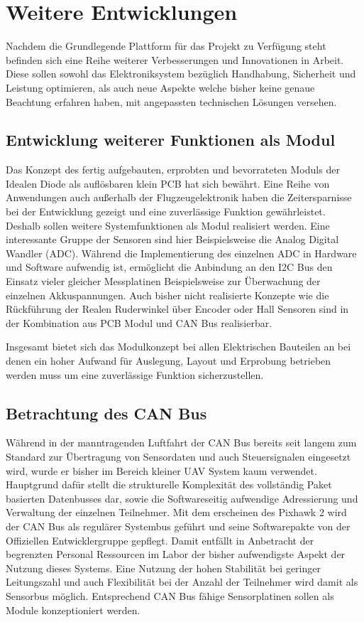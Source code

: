 \chapter{Weitere Entwicklungen}\label{cha:Weitere Entwicklungen}

Nachdem die Grundlegende Plattform für das Projekt zu Verfügung steht befinden sich eine Reihe weiterer Verbesserungen und Innovationen in Arbeit. Diese sollen sowohl das Elektroniksystem bezüglich Handhabung, Sicherheit und Leistung optimieren, als auch neue Aspekte welche bisher keine genaue Beachtung erfahren haben, mit angepassten technischen Lösungen versehen.


\section{Entwicklung weiterer Funktionen als Modul}

Das Konzept des fertig aufgebauten, erprobten und bevorrateten Moduls der Idealen Diode als auflösbaren klein PCB hat sich bewährt. Eine Reihe von Anwendungen auch außerhalb der Flugzeugelektronik haben die Zeitersparnisse bei der Entwicklung gezeigt und eine zuverlässige Funktion gewährleistet.
Deshalb sollen weitere Systemfunktionen als Modul realisiert werden.
Eine interessante Gruppe der Sensoren sind hier Beispielsweise die Analog Digital Wandler (ADC). Während die Implementierung des einzelnen ADC in Hardware und Software aufwendig ist, ermöglicht die Anbindung an den I2C Bus den Einsatz vieler gleicher Messplatinen Beispielsweise zur Überwachung der einzelnen Akkuspannungen.
Auch bisher nicht realisierte Konzepte wie die Rückführung der Realen Ruderwinkel über Encoder oder Hall Sensoren sind in der Kombination aus PCB Modul und CAN Bus realisierbar.

Insgesamt bietet sich das Modulkonzept bei allen Elektrischen Bauteilen an bei denen ein hoher Aufwand für Auslegung, Layout und Erprobung betrieben werden muss um eine zuverlässige Funktion sicherzustellen.

\section{Betrachtung des CAN Bus}

Während in der manntragenden Luftfahrt der CAN Bus bereits seit langem zum Standard zur Übertragung von Sensordaten und auch Steuersignalen eingesetzt wird, wurde er bisher im Bereich kleiner UAV System kaum verwendet. Hauptgrund dafür stellt die strukturelle  Komplexität des vollständig Paket basierten Datenbusses dar, sowie die Softwareseitig aufwendige Adressierung und Verwaltung der einzelnen Teilnehmer.
Mit dem erscheinen des Pixhawk 2 wird der CAN Bus als regulärer Systembus geführt und seine Softwarepakte von der Offiziellen Entwicklergruppe gepflegt. Damit entfällt in Anbetracht der begrenzten Personal Ressourcen im Labor der bisher aufwendigste Aspekt der Nutzung dieses Systems. Eine Nutzung der hohen Stabilität bei geringer Leitungszahl und auch Flexibilität bei der Anzahl der Teilnehmer wird damit als Sensorbus möglich.
Entsprechend CAN Bus fähige Sensorplatinen sollen als Module konzeptioniert werden.

